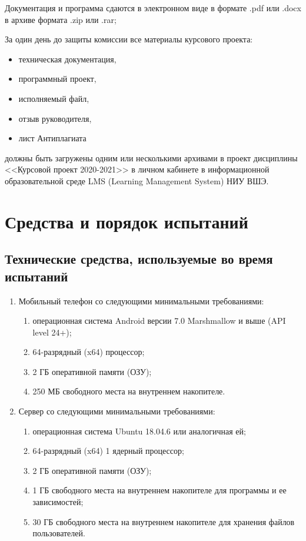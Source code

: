 \documentclass[a4paper,12pt]{article}
\begin{document}
  Документация и программа сдаются в электронном виде в формате .pdf или .docx в архиве формата .zip или .rar;

  За один день до защиты комиссии все материалы курсового проекта:
  \begin{itemize}
    \item техническая документация,
    \item программный проект,
    \item исполняемый файл,
    \item отзыв руководителя,
    \item лист Антиплагиата
  \end{itemize}
  должны быть загружены одним или несколькими архивами в проект дисциплины <<Курсовой проект 2020-2021>> в личном кабинете в информационной образовательной среде LMS (Learning Management System) НИУ ВШЭ.

  \newpage
  \section{Средства и порядок испытаний}
  \subsection{Технические средства, используемые во время испытаний}
  \begin{enumerate}
    \item Мобильный телефон со следующими минимальными требованиями:
    \begin{enumerate}
      \item операционная система Android версии 7.0 Marshmallow и выше (API level 24+);
      \item 64-разрядный (x64) процессор;
      \item 2 ГБ оперативной памяти (ОЗУ);
      \item 250 МБ свободного места на внутреннем накопителе.
    \end{enumerate}
    \item Сервер со следующими минимальными требованиями:
    \begin{enumerate}
      \item операционная система Ubuntu 18.04.6 или аналогичная ей;
      \item 64-разрядный (x64) 1 ядерный процессор;
      \item 2 ГБ оперативной памяти (ОЗУ);
      \item 1 ГБ свободного места на внутреннем накопителе для программы и ее зависимостей;
      \item 30 ГБ свободного места на внутреннем накопителе для хранения файлов пользователей.
    \end{enumerate}
  \end{enumerate}
\end{document}
